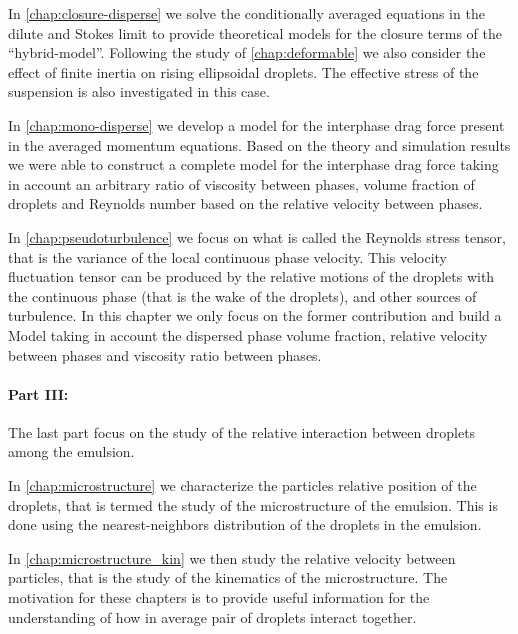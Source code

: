 In \ref{chap:closure-disperse} we solve the conditionally averaged equations in the dilute and Stokes limit to provide theoretical models for the closure terms of the ``hybrid-model''. 
Following the study of \ref{chap:deformable} we also consider the effect of finite inertia on rising ellipsoidal droplets.
The effective stress of the suspension is also investigated in this case.  


In \ref{chap:mono-disperse} we develop a model for the interphase drag force present in the averaged momentum equations. 
Based on the theory and simulation results we were able to construct a complete model for the interphase drag force taking in account an arbitrary ratio of viscosity between phases, volume fraction of droplets and Reynolds number based on the relative velocity between phases. 

In \ref{chap:pseudoturbulence} we focus on what is called the Reynolds stress tensor, that is the variance of the local continuous phase velocity. 
This velocity fluctuation tensor can be produced by the relative motions of the droplets with the continuous phase (that is the wake of the droplets), and other sources of turbulence. 
In this chapter we only focus on the former contribution and build a Model taking in account the dispersed phase volume fraction, relative velocity between phases and viscosity ratio between phases. 



\paragraph*{Part III:} 
The last part  focus on the study of the relative interaction between droplets among the emulsion. 


In \ref{chap:microstructure} we characterize the particles relative position of the droplets, that is termed the study of the microstructure of the emulsion. 
This is done using the nearest-neighbors distribution of the droplets in the emulsion. 

In \ref{chap:microstructure_kin} we then study the relative velocity between particles, that is the study of the kinematics   of the microstructure. 
The motivation for these  chapters is to provide useful information for the understanding of how in average pair of droplets interact together. 




